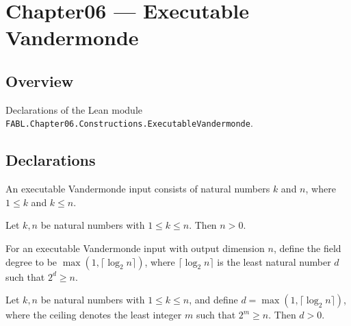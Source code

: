 \chapter{Chapter06 — Executable Vandermonde}
\section{Overview}

Declarations of the Lean module \texttt{FABL.Chapter06.Constructions.ExecutableVandermonde}.

\section{Declarations}

\begin{definition}
\label{FABL.ExecutableVandermondeInput}
\leanok
An executable Vandermonde input consists of natural numbers $k$ and $n$, where $1 \le k$
and $k \le n$.
\end{definition}

\begin{theorem}
\label{FABL.ExecutableVandermondeInput.n_pos}
\leanok
{}
Let $k,n$ be natural numbers with $1\le k\le n$. Then $n>0$.
\end{theorem}

\begin{definition}
\label{FABL.ExecutableVandermondeInput.fieldDegree}
\leanok
{}
For an executable Vandermonde input with output dimension $n$, define the field degree
to be $\max(1,\lceil\log_2 n\rceil)$, where $\lceil\log_2 n\rceil$ is the least natural
number $d$ such that $2^d\geq n$.
\end{definition}

\begin{theorem}
\label{FABL.ExecutableVandermondeInput.fieldDegree_pos}
\leanok
{}
Let $k,n$ be natural numbers with $1\le k\le n$, and define $d=\max(1,\lceil\log_2
n\rceil)$, where the ceiling denotes the least integer $m$ such that $2^m\ge n$. Then
$d>0$.
\end{theorem}

